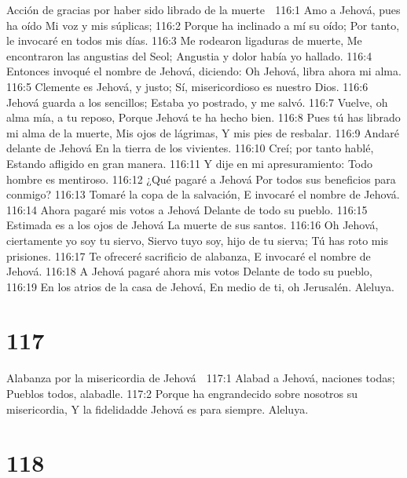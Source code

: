 Acción de gracias por haber sido librado de la muerte 

116:1 Amo a Jehová, pues ha oído 
Mi voz y mis súplicas; 
116:2 Porque ha inclinado a mí su oído; 
Por tanto, le invocaré en todos mis días. 
116:3 Me rodearon ligaduras de muerte, 
Me encontraron las angustias del Seol; 
Angustia y dolor había yo hallado. 
116:4 Entonces invoqué el nombre de Jehová, diciendo: 
Oh Jehová, libra ahora mi alma. 
116:5 Clemente es Jehová, y justo; 
Sí, misericordioso es nuestro Dios. 
116:6 Jehová guarda a los sencillos; 
Estaba yo postrado, y me salvó. 
116:7 Vuelve, oh alma mía, a tu reposo, 
Porque Jehová te ha hecho bien. 
116:8 Pues tú has librado mi alma de la muerte, 
Mis ojos de lágrimas, 
Y mis pies de resbalar. 
116:9 Andaré delante de Jehová 
En la tierra de los vivientes. 
116:10 Creí; por tanto hablé, 
Estando afligido en gran manera. 
116:11 Y dije en mi apresuramiento: 
Todo hombre es mentiroso. 
116:12 ¿Qué pagaré a Jehová 
Por todos sus beneficios para conmigo? 
116:13 Tomaré la copa de la salvación, 
E invocaré el nombre de Jehová. 
116:14 Ahora pagaré mis votos a Jehová 
Delante de todo su pueblo. 
116:15 Estimada es a los ojos de Jehová 
La muerte de sus santos. 
116:16 Oh Jehová, ciertamente yo soy tu siervo, 
Siervo tuyo soy, hijo de tu sierva; 
Tú has roto mis prisiones. 
116:17 Te ofreceré sacrificio de alabanza, 
E invocaré el nombre de Jehová. 
116:18 A Jehová pagaré ahora mis votos 
Delante de todo su pueblo, 
116:19 En los atrios de la casa de Jehová, 
En medio de ti, oh Jerusalén. 
Aleluya. 

\chapter{117}

Alabanza por la misericordia de Jehová 

117:1 Alabad a Jehová, naciones todas; 
Pueblos todos, alabadle. 
117:2 Porque ha engrandecido sobre nosotros su misericordia, 
Y la fidelidadde Jehová es para siempre. 
Aleluya. 

\chapter{118}

